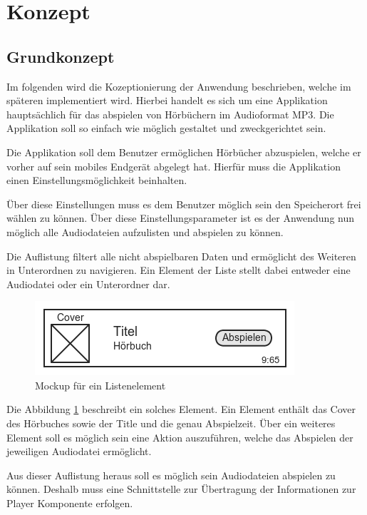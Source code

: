 \section{Konzept}
\subsection{Grundkonzept}

Im folgenden wird die Kozeptionierung der Anwendung beschrieben, welche im späteren implementiert wird. Hierbei handelt es sich um eine Applikation hauptsächlich für das abspielen von Hörbüchern im Audioformat MP3. Die Applikation soll so einfach wie möglich gestaltet und zweckgerichtet sein.

Die Applikation soll dem Benutzer ermöglichen Hörbücher abzuspielen, welche er vorher auf sein mobiles Endgerät abgelegt hat. Hierfür muss die Applikation einen Einstellungsmöglichkeit beinhalten.

Über diese Einstellungen muss es dem Benutzer möglich sein den Speicherort frei wählen zu können. Über diese Einstellungsparameter ist es der Anwendung nun möglich alle Audiodateien aufzulisten und abspielen zu können.

Die Auflistung filtert alle nicht abspielbaren Daten und ermöglicht des Weiteren in Unterordnen zu navigieren. Ein Element der Liste stellt dabei entweder eine Audiodatei oder ein Unterordner dar. 

\begin{figure}
\begin{center}
\includegraphics[scale=0.8]{images/listitem}
\caption{Mockup für ein Listenelement}
\label{mocklistel}
\end{center}
\end{figure}

Die Abbildung \ref{mocklistel} beschreibt ein solches Element. Ein Element enthält das Cover des Hörbuches sowie der Title und die genau Abspielzeit. Über ein weiteres Element soll es möglich sein eine Aktion auszuführen, welche das Abspielen der jeweiligen Audiodatei ermöglicht.

Aus dieser Auflistung heraus soll es möglich sein Audiodateien abspielen zu können. Deshalb muss eine Schnittstelle zur Übertragung der Informationen zur Player Komponente erfolgen.

